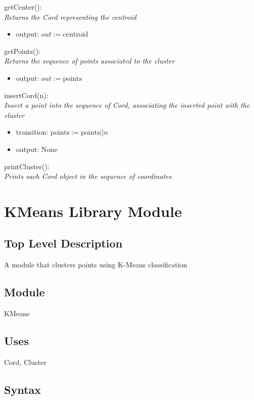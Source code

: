\documentclass[12pt]{article}
\begin{document}
\noindent
getCenter():\\
\textit{Returns the Cord representing the centroid}
\begin{itemize}
\item output: $out := \mbox{centroid}$
\end{itemize}

\noindent
getPoints():\\
\textit{Returns the sequence of points associated to the cluster}
\begin{itemize}
\item output: $out := \mbox{points}$
\end{itemize}

\noindent
insertCord(n):\\
\textit{Insert a point into the sequence of Cord, associating the inserted
point with the cluster}
\begin{itemize}
\item transition: $\mbox{points} := \mbox{points} || n$
\item output: None
\end{itemize}

\noindent
printCluster():\\
\textit{Prints each Cord object in the sequence of coordinates}

\newpage

\section*{KMeans Library Module}

\subsection* {Top Level Description}

A module that clusters points using K-Means classification

\subsection*{Module}

KMeans

\subsection* {Uses}

Cord, Cluster

\subsection* {Syntax}
\end{document}

